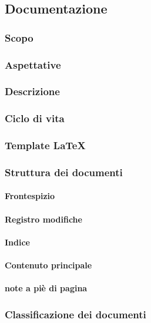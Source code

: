 \subsection{Documentazione}

		\subsubsection{Scopo}

		\subsubsection{Aspettative}

		\subsubsection{Descrizione}

		\subsubsection{Ciclo di vita}

		\subsubsection{Template LaTeX}

		\subsubsection{Struttura dei documenti}
			\paragraph{Frontespizio}
			\paragraph{Registro modifiche}
			\paragraph{Indice}
			\paragraph{Contenuto principale}
			\paragraph{note a piè di pagina}

		\subsubsection{Classificazione dei documenti}
